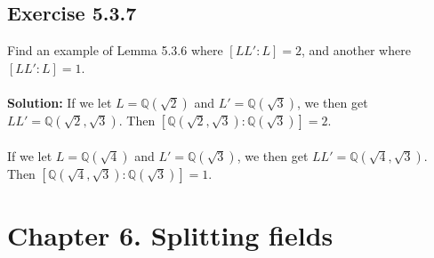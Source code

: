 \documentclass{article}
\begin{document}
\subsection*{Exercise 5.3.7}
Find an example of Lemma 5.3.6 where $[LL':L]=2$, and another where $[LL':L]=1$.
\\\\
\textbf{Solution:}
If we let $L = \mathbb{Q}(\sqrt2)$ and $L' = \mathbb{Q}(\sqrt3)$, we then get $LL' = \mathbb{Q}(\sqrt2,\sqrt3)$.
Then $[\mathbb{Q}(\sqrt2,\sqrt3):\mathbb{Q}(\sqrt3)] = 2$.\\\\
If we let $L = \mathbb{Q}(\sqrt4)$ and $L' = \mathbb{Q}(\sqrt3)$, we then get $LL' = \mathbb{Q}(\sqrt4,\sqrt3)$.
Then $[\mathbb{Q}(\sqrt4,\sqrt3):\mathbb{Q}(\sqrt3)] = 1$.


\section*{Chapter 6. Splitting fields}
\end{document}
